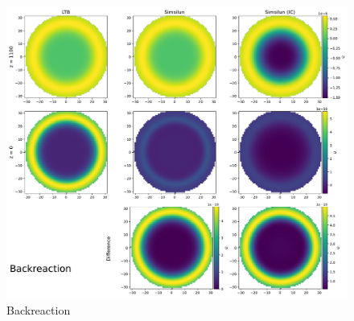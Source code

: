 \begin{figure}
    \centering
    \includegraphics[width=\textwidth]{../plots/Backreaction.pdf}
    \caption{Backreaction}
    \label{fig:backreaction}
\end{figure}


